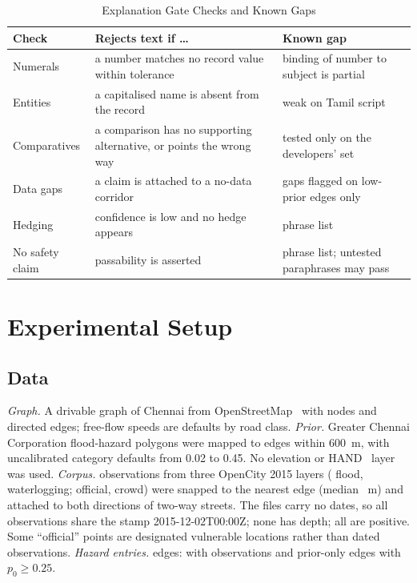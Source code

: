 \documentclass[conference]{IEEEtran}
\begin{document}
\begin{table}[t]
\centering
\caption{Explanation Gate Checks and Known Gaps}
\label{tab:rules}
\footnotesize
\begin{tabular}{>{\raggedright\arraybackslash}p{1.45cm}>{\raggedright\arraybackslash}p{3.3cm}>{\raggedright\arraybackslash}p{2.9cm}}
\toprule
Check & Rejects text if \ldots & Known gap\\
\midrule
Numerals & a number matches no record value within tolerance & binding of number to subject is partial\\
Entities & a capitalised name is absent from the record & weak on Tamil script\\
Comparatives & a comparison has no supporting alternative, or points the wrong way & tested only on the developers' set\\
Data gaps & a claim is attached to a no-data corridor & gaps flagged on low-prior edges only\\
Hedging & confidence is low and no hedge appears & phrase list\\
No safety claim & passability is asserted & phrase list; untested paraphrases may pass\\
\bottomrule
\end{tabular}
\end{table}

\section{Experimental Setup}\label{sec:setup}
\subsection{Data}
\emph{Graph.} A drivable graph of Chennai from OpenStreetMap~\cite{haklay2008osm} with \NNodes{} nodes and \NEdges{} directed edges; free-flow speeds are defaults by road class.
\emph{Prior.} \NZones{} Greater Chennai Corporation flood-hazard polygons were mapped to edges within 600~m, with uncalibrated category defaults from 0.02 to 0.45. No elevation or HAND~\cite{nobre2011hand} layer was used.
\emph{Corpus.} \NObs{} observations from three OpenCity 2015 layers (\NFlood{} flood, \NWater{} waterlogging; \NOfficial{} official, \NCrowd{} crowd) were snapped to the nearest edge (median \SnapMed~m) and attached to both directions of two-way streets. The files carry no dates, so all observations share the stamp 2015-12-02T00:00Z; none has depth; all are positive. Some ``official'' points are designated vulnerable locations rather than dated observations.
\emph{Hazard entries.} \NHazEdges{} edges: \NObsEdges{} with observations and \NPriorEdges{} prior-only edges with $p_0\ge0.25$.
\end{document}
